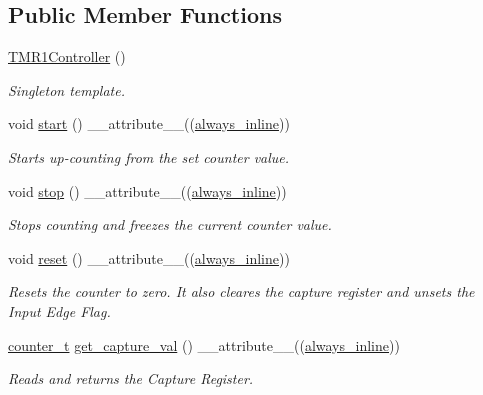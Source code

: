 \subsection*{Public Member Functions}
\begin{DoxyCompactItemize}
\item 
\hyperlink{classTMR1Controller_aebc677e795f673c6520d5a03eb6aa4f2}{T\+M\+R1\+Controller} ()
\begin{DoxyCompactList}\small\item\em Singleton template. \end{DoxyCompactList}\item 
void \hyperlink{classTMR1Controller_a67bc04f0648176a681f6ac01ea483db9}{start} () \+\_\+\+\_\+attribute\+\_\+\+\_\+((\hyperlink{classTMR1Controller_adce8e8a496510485a88ccc5b88595672}{always\+\_\+inline}))
\begin{DoxyCompactList}\small\item\em Starts up-\/counting from the set counter value. \end{DoxyCompactList}\item 
void \hyperlink{classTMR1Controller_afcb0ea27107bfbe50b9dcbd54207dd00}{stop} () \+\_\+\+\_\+attribute\+\_\+\+\_\+((\hyperlink{classTMR1Controller_adce8e8a496510485a88ccc5b88595672}{always\+\_\+inline}))
\begin{DoxyCompactList}\small\item\em Stops counting and freezes the current counter value. \end{DoxyCompactList}\item 
void \hyperlink{classTMR1Controller_adf3746ffd24c5b55abff4fa18e05f6b3}{reset} () \+\_\+\+\_\+attribute\+\_\+\+\_\+((\hyperlink{classTMR1Controller_adce8e8a496510485a88ccc5b88595672}{always\+\_\+inline}))
\begin{DoxyCompactList}\small\item\em Resets the counter to zero. It also cleares the capture register and unsets the Input Edge Flag. \end{DoxyCompactList}\item 
\hyperlink{types_8hpp_ac89ac912f524b3e3fa3720ea55fec966}{counter\+\_\+t} \hyperlink{classTMR1Controller_a3d07eed72365e7a7b44fadefb23b9ba6}{get\+\_\+capture\+\_\+val} () \+\_\+\+\_\+attribute\+\_\+\+\_\+((\hyperlink{classTMR1Controller_adce8e8a496510485a88ccc5b88595672}{always\+\_\+inline}))
\begin{DoxyCompactList}\small\item\em Reads and returns the Capture Register. \end{DoxyCompactList}\item 

\end{DoxyCompactItemize}
